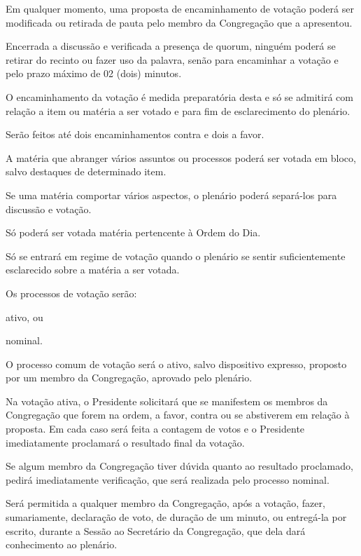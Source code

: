 \documentclass{documento}
\begin{document}
\paragrafo Em qualquer momento, uma proposta de encaminhamento de votação poderá ser modificada ou retirada de pauta pelo membro da Congregação que a apresentou.

\artigo Encerrada a discussão e verificada a presença de quorum, ninguém poderá se retirar do recinto ou fazer uso da palavra, senão para encaminhar a votação e pelo prazo máximo de 02 (dois) minutos.

\paragrafo O encaminhamento da votação é medida preparatória desta e só se admitirá com relação a item ou matéria a ser votado e para fim de esclarecimento do plenário.

\paragrafo Serão feitos até dois encaminhamentos contra e dois a favor.

\artigo A matéria que abranger vários assuntos ou processos poderá ser votada em bloco, salvo destaques de determinado item.

\paragrafounico Se uma matéria comportar vários aspectos, o plenário poderá separá-los para discussão e votação.


\artigo Só poderá ser votada matéria pertencente à Ordem do Dia.

\artigo Só se entrará em regime de votação quando o plenário se sentir suficientemente esclarecido sobre a matéria a ser votada.

\artigo Os processos de votação serão:

\inciso ativo, ou

\inciso nominal.

\artigo O processo comum de votação será o ativo, salvo dispositivo expresso, proposto por um membro da Congregação, aprovado pelo plenário.

\paragrafo Na votação ativa, o Presidente solicitará que se manifestem os membros da Congregação que forem na ordem, a favor, contra ou se abstiverem em relação à proposta. Em cada caso será feita a contagem de votos e o Presidente imediatamente proclamará o resultado final da votação.

\paragrafo Se algum membro da Congregação tiver dúvida quanto ao resultado proclamado, pedirá imediatamente verificação, que será realizada pelo processo nominal.

\paragrafo Será permitida a qualquer membro da Congregação, após a votação, fazer, sumariamente, declaração de voto, de duração de um minuto, ou entregá-la por escrito, durante a Sessão ao Secretário da Congregação, que dela dará conhecimento ao plenário.
\end{document}
